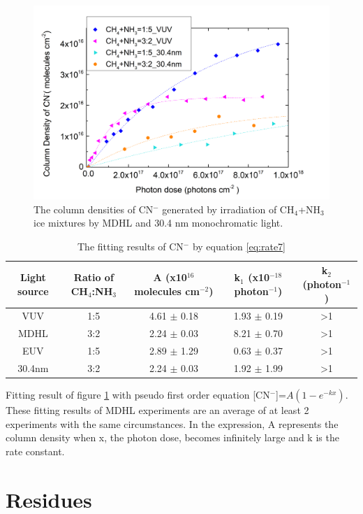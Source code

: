 \begin{figure}
\centering
\includegraphics[width=\textwidth]{figures/chapter3/CN_rate_EUV.png}
\caption{The column densities of CN$^-$ generated by irradiation of CH$_4$+NH$_3$ ice mixtures by MDHL and 30.4 nm monochromatic light.}
\label{fig:CN_NSRRC}
\end{figure}

\begin{table}[htbp]
\caption{The fitting results of CN$^-$ by equation \ref{eq:rate7}}
\label{tab:CNrate_NSRRC}
\begin{tabular}{ccccc}
\hline
\hline
Light source & Ratio of CH$_4$:NH$_3$ & A (x10$^{16}$ molecules cm$^{-2}$) & k$_1$ (x10$^{-18}$ photon$^{-1}$) & k$_2$ (photon$^{-1}$)\\
\hline
VUV & 1:5 & 4.61 $\pm$ 0.18 & 1.93 $\pm$ 0.19 & >1 \\
MDHL & 3:2 & 2.24 $\pm$ 0.03 & 8.21 $\pm$ 0.70 & >1 \\
\hline
EUV & 1:5 & 2.89 $\pm$ 1.29 & 0.63 $\pm$ 0.37 & >1 \\
 30.4nm & 3:2 & 2.24 $\pm$ 0.03 & 1.92 $\pm$ 1.99 & >1 \\
\hline
\end{tabular}
Fitting result of figure \ref{fig:CN_NSRRC} with pseudo first order equation [CN$^-$]=$A(1-e^{-kx})$. These fitting results of MDHL experiments are an average of at least 2 experiments with the same circumstances. In the expression, A represents the column density when x, the photon dose, becomes infinitely large and k is the rate constant.\
\end{table}


\section{Residues}

